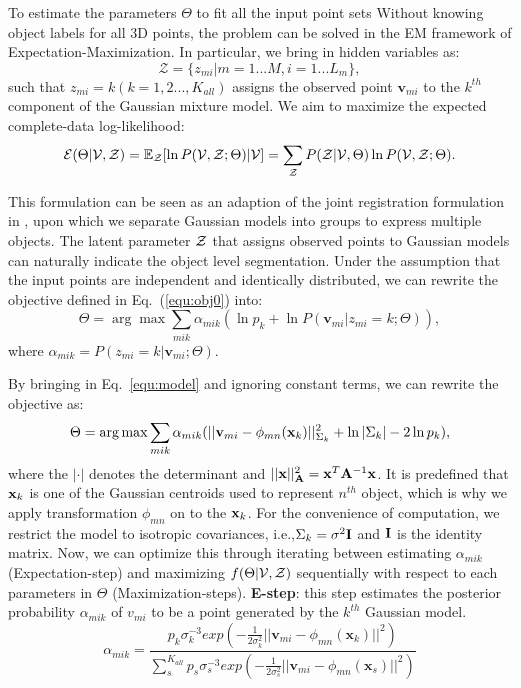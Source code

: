 To estimate the parameters $\Theta$ to fit all the input point sets Without knowing object labels for all 3D points, the problem can be solved in the EM framework of Expectation-Maximization. 
%
In particular, we bring in hidden variables as: 
\begin{equation}
\mathcal{Z}=\{z_{mi}|m=1...M,i=1...L_m\},
\end{equation}
%
such that $z_{mi}=k(k=1,2...,K_{all})$ assigns the observed point $\pmb{v}_{mi}$ to the $k^{th}$ component of the Gaussian mixture model. 
%
We aim to maximize the expected complete-data log-likelihood:
\begin{equation}
\label{equ:obj0}
\mathcal{E}(\Theta|\mathcal{V},\mathcal{Z})=\mathbb{E}_{\mathcal{Z}}[\ln P(\mathcal{V},\mathcal{Z};\Theta)|\mathcal{V}]={\sum_{\mathcal{Z}}P(\mathcal{Z}|\mathcal{V},\Theta)\ln{P(\mathcal{V},\mathcal{Z};\Theta)}}.
\end{equation}


This formulation can be seen as an adaption of the joint registration formulation in \cite{Evangelidis2014}, upon which we separate Gaussian models into groups to express multiple objects. 
%
The latent parameter $\mathcal{Z}$ that assigns observed points to Gaussian models can naturally indicate the object level segmentation.
%
Under the assumption that the input points are independent and identically distributed, we can rewrite the objective defined in Eq.~(\ref{equ:obj0}) into:
%
\begin{equation} \label{equ:obj2}
\Theta=\arg\max\sum_{mik}\alpha_{mik}(\ln p_k + \ln P(\pmb{v}_{mi}|z_{mi}=k;\Theta)),
\end{equation}
%
where $\alpha_{mik} = P( z_{mi} = k | \pmb{v}_{mi} ; \Theta )$.


By bringing in Eq.~\ref{equ:model} and ignoring constant terms, we can rewrite the objective as:
\begin{equation}
\label{equ:obj3}
\Theta=\arg\max\sum_{mik}\alpha_{mik}(||\mathbf{v}_{mi}-\phi_{mn}(\mathbf{x}_k)||_{\Sigma_k}^2 + \ln |\Sigma_k| - 2\ln p_k), 
\end{equation}
%
where the $|\cdot|$ denotes the determinant and $||\mathbf{x}||_{\mathbf{A}}^2=\mathbf{x}^T\mathbf{A}^{-1}\mathbf{x}$. 
%
It is predefined that $\mathbf{x}_k$ is one of the Gaussian centroids used to represent $n^{th}$ object, which is why we apply transformation $\phi_{mn}$ on to the $\mathbf{x}_k$. 
%
For the convenience of computation, we restrict the model to isotropic covariances, i.e.,$\Sigma_k=\sigma^2\mathbf{I}$ and $\mathbf{I}$ is the identity matrix.
%
Now, we can optimize this through iterating between estimating $\alpha_{mik}$ (Expectation-step) and maximizing $f(\Theta|\mathcal{V},\mathcal{Z})$ sequentially with respect to each parameters in $\Theta$ (Maximization-steps).
%
\textbf{E-step}:
this step estimates the posterior probability $\alpha_{mik}$ of $v_{mi}$ to be a point generated by the $k^{th}$ Gaussian model.
%
\begin{equation}
\label{equ:estep}
\alpha_{mik}=\frac{p_k\sigma_k^{-3}exp(-\frac{1}{2\sigma_k^2}||\pmb v_{mi}-\phi_{mn}(\pmb x_k)||^2)}{\sum_s^{K_{all}}p_s\sigma_s^{-3}exp(-\frac{1}{2\sigma_s^2}||\pmb v_{mi}-\phi_{mn}(\pmb x_s)||^2)}
\end{equation}
%


